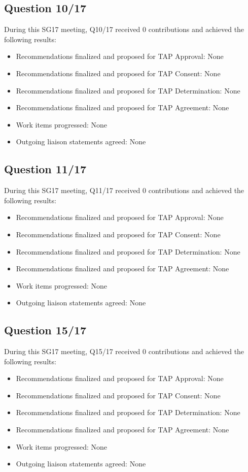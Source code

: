 \subsection{Question 10/17}

During this SG17 meeting, Q10/17 received 0 contributions and achieved the following results:

\begin{itemize}
  \item Recommendations finalized and proposed for TAP Approval: None
  \item Recommendations finalized and proposed for TAP Consent: None
  \item Recommendations finalized and proposed for TAP Determination: None
  \item Recommendations finalized and proposed for TAP Agreement: None
  \item Work items progressed: None
  \item Outgoing liaison statements agreed: None
\end{itemize}

\subsection{Question 11/17}

During this SG17 meeting, Q11/17 received 0 contributions and achieved the following results:

\begin{itemize}
  \item Recommendations finalized and proposed for TAP Approval: None
  \item Recommendations finalized and proposed for TAP Consent: None
  \item Recommendations finalized and proposed for TAP Determination: None
  \item Recommendations finalized and proposed for TAP Agreement: None
  \item Work items progressed: None
  \item Outgoing liaison statements agreed: None
\end{itemize}

\subsection{Question 15/17}

During this SG17 meeting, Q15/17 received 0 contributions and achieved the following results:

\begin{itemize}
  \item Recommendations finalized and proposed for TAP Approval: None
  \item Recommendations finalized and proposed for TAP Consent: None
  \item Recommendations finalized and proposed for TAP Determination: None
  \item Recommendations finalized and proposed for TAP Agreement: None
  \item Work items progressed: None
  \item Outgoing liaison statements agreed: None
\end{itemize}
